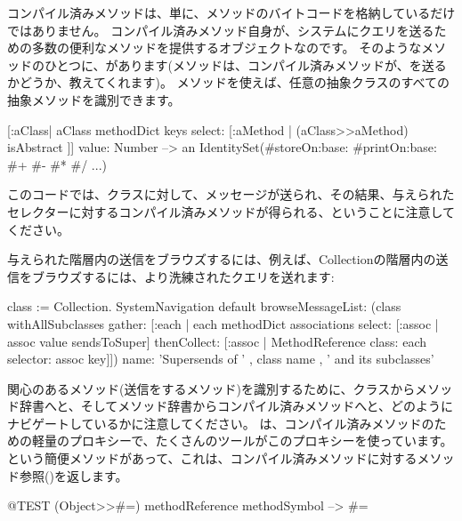 \documentclass[a4paper,10pt,twoside]{book}
\begin{document}
コンパイル済みメソッドは、単に、メソッドのバイトコードを格納しているだけではありません。
コンパイル済みメソッド自身が、システムにクエリを送るための多数の便利なメソッドを提供するオブジェクトなのです。
そのようなメソッドのひとつに、があります(メソッドは、コンパイル済みメソッドが、を送るかどうか、教えてくれます)。
メソッドを使えば、任意の抽象クラスのすべての抽象メソッドを識別できます。
\begin{code}{}
[:aClass| aClass methodDict keys select: [:aMethod |
  (aClass>>aMethod) isAbstract ]] value: Number
  --> an IdentitySet(#storeOn:base: #printOn:base: #+ #- #* #/ ...)
\end{code}
このコードでは、クラスに対して、\ct{>>}メッセージが送られ、その結果、与えられたセレクターに対するコンパイル済みメソッドが得られる、ということに注意してください。


与えられた階層内の\super{}送信をブラウズするには、例えば、Collectionの階層内の\super{}送信をブラウズするには、より洗練されたクエリを送れます:
\begin{code}{}
class := Collection.
SystemNavigation default
  browseMessageList: (class withAllSubclasses gather: [:each |
    each methodDict associations
      select: [:assoc | assoc value sendsToSuper]
      thenCollect: [:assoc | MethodReference class: each selector: assoc key]])
  name: 'Supersends of ' , class name , ' and its subclasses'
\end{code}
関心のあるメソッド(\super{}送信をするメソッド)を識別するために、クラスからメソッド辞書へと、そしてメソッド辞書からコンパイル済みメソッドへと、どのようにナビゲートしているかに注意してください。
は、コンパイル済みメソッドのための軽量のプロキシーで、たくさんのツールがこのプロキシーを使っています。
という簡便メソッドがあって、これは、コンパイル済みメソッドに対するメソッド参照()を返します。%
\begin{code}{@TEST}
(Object>>#=) methodReference methodSymbol --> #=
\end{code}
\end{document}
